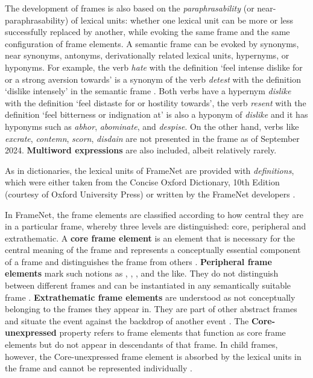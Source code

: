 \documentclass[output=paper,colorlinks,citecolor=brown]{langscibook}
\begin{document}
The development of frames is also based on the \emph{paraphrasability} (or near-paraphrasability) of lexical units: whether one lexical unit can be more or less successfully replaced by another, while evoking the same frame and the same configuration of frame elements. A semantic frame can be evoked by synonyms, near synonyms, antonyms, derivationally related lexical units, hypernyms, or hyponyms. For example, the  verb \textit{hate} with the definition `feel intense dislike for or a strong aversion towards' is a synonym of the verb \textit{detest} with the definition `dislike intensely' in the semantic frame .  Both verbs 
have a hypernym \textit{dislike} with the definition `feel distaste for or hostility towards', the verb \textit{resent} with the definition `feel bitterness or indignation at' is also a hyponym of {\textit{dislike}} and it has hyponyms such as \textit{abhor}, \textit{abominate}, and  \textit{despise}. On the other hand, verbs like \textit{excrate}, \textit{contemn}, \textit{scorn}, \textit{disdain} are not presented in the frame as of September 2024. \textbf{Multiword expressions} are also included, albeit relatively rarely.

As in dictionaries, the lexical units of FrameNet are provided with \emph{definitions}, which were either taken from the Concise Oxford Dictionary, 10th Edition (courtesy of Oxford University Press) or written by the FrameNet developers \citep[9]{Ruppenhofer2016}.

In FrameNet, the frame elements are classified according to how central they are in a particular frame, whereby three levels are distinguished: core, peripheral and extrathematic.
A \textbf{core frame element} is an element that is necessary for the central meaning of the frame \citep[133]{fillmore2007valency} and represents a conceptually essential component of a frame and distinguishes the frame from others \citep[23]{Ruppenhofer2016}. \textbf{Peripheral frame elements} mark such notions as , , ,   and the like. They do not distinguish between different frames and can be instantiated in any semantically suitable frame \citep[24]{Ruppenhofer2016}.
\textbf{Extrathematic frame elements} are understood as not conceptually belonging to the frames they appear in. They are part of other abstract frames and situate the event against the backdrop of another event \citep[133]{fillmore2007valency}.
The \textbf{Core-unexpressed} property refers to frame elements that function as core frame elements but do not appear in descendants of that frame. In child frames, however, the Core-unexpressed frame element is absorbed by the lexical units in the frame and cannot be represented individually \citep[25]{Ruppenhofer2016}.
\end{document}
